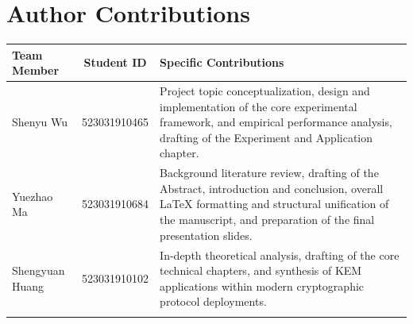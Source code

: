 \chapter{Author Contributions}

\begin{longtable}{l c p{8.5cm}}
\toprule
\textbf{Team Member} & \textbf{Student ID} & \textbf{Specific Contributions} \\
\midrule
\endhead

Shenyu Wu & 523031910465 & 
Project topic conceptualization, design and implementation of the core experimental framework, and empirical performance analysis, drafting of the Experiment and Application chapter. \\
\addlinespace

Yuezhao Ma & 523031910684 & 
Background literature review, drafting of the Abstract, introduction and conclusion, overall \LaTeX{} formatting and structural unification of the manuscript, and preparation of the final presentation slides. \\
\addlinespace

Shengyuan Huang & 523031910102 & 
In-depth theoretical analysis, drafting of the core technical chapters, and synthesis of KEM applications within modern cryptographic protocol deployments. \\

\addlinespace
\bottomrule
\end{longtable}